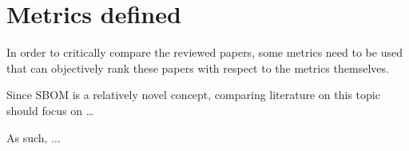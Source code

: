 \section{Metrics defined}

In order to critically compare the reviewed papers, some metrics need to be used that can objectively rank these papers with respect to the metrics themselves.

Since SBOM is a relatively novel concept, comparing literature on this topic should focus on \dots

As such, ...